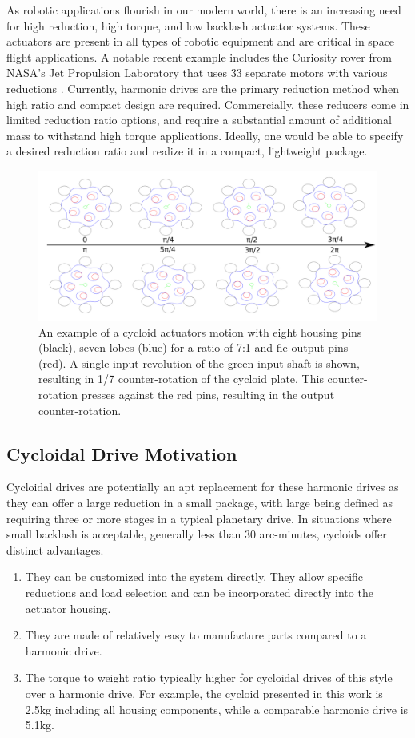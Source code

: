 As robotic applications flourish in our modern world, there is an increasing need for high reduction, high torque, and low backlash actuator systems.
These actuators are present in all types of robotic equipment and are critical in space flight applications.
A notable recent example includes the Curiosity rover from NASA's Jet Propulsion Laboratory that uses 33 separate motors with various reductions \cite{curiosity}.
Currently, harmonic drives are the primary reduction method when high ratio and compact design are required.
Commercially, these reducers come in limited reduction ratio options, and require a substantial amount of additional mass to withstand high torque applications.
Ideally, one would be able to specify a desired reduction ratio and realize it in a compact, lightweight package.

\begin{figure}[t]
	\centering
	\includegraphics[width=0.8\linewidth]{images/single_motion}
	\caption{An example of a cycloid actuators motion with eight housing pins (black), seven lobes (blue) for a ratio of 7:1 and fie output pins (red). A single input revolution of the green input shaft is shown, resulting in 1/7 counter-rotation of the cycloid plate. This counter-rotation presses against the red pins, resulting in the output counter-rotation. 
	}
	\label{cycloid_motion}
\end{figure}

\subsection{Cycloidal Drive Motivation}

Cycloidal drives are potentially an apt replacement for these harmonic drives as they can offer a large reduction in a small package, with large being defined as requiring three or more stages in a typical planetary drive. 
In situations where small backlash is acceptable, generally less than 30 arc-minutes, cycloids offer distinct advantages.

\begin{enumerate}
\item
They can be customized into the system directly. They allow specific reductions and load selection and can be incorporated directly into the actuator housing.
\item
They are made of relatively easy to manufacture parts compared to a harmonic drive.
\item
The torque to weight ratio typically higher for cycloidal drives of this style over a harmonic drive.
For example, the cycloid presented in this work is 2.5kg including all housing components, while a comparable harmonic drive is 5.1kg.
\end{enumerate}

